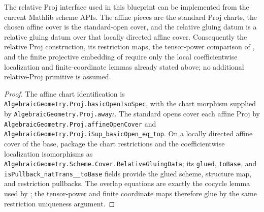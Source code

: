 \begin{lemma}
  \label{lemma:nagata-relative-proj-current-api}

  The relative Proj interface used in this blueprint can be implemented from
  the current Mathlib scheme APIs.  The affine pieces are the standard Proj
  charts, the chosen affine cover is the standard-open cover, and the relative
  gluing datum is a relative gluing datum over that locally directed affine
  cover.  Consequently the relative Proj construction, its restriction maps,
  the tensor-power comparison of
  , and the finite
  projective embedding of
   require only the local
  coefficientwise localization and finite-coordinate lemmas already stated
  above; no additional relative-Proj primitive is assumed.
\end{lemma}

\begin{proof}
  The affine chart identification is
  \texttt{AlgebraicGeometry.Proj.basicOpenIsoSpec}, with the chart morphism
  supplied by \texttt{AlgebraicGeometry.Proj.away\ensuremath{\iota}}.  The
  standard opens cover each affine Proj by
  \texttt{AlgebraicGeometry.Proj.affineOpenCover} and
  \texttt{AlgebraicGeometry.Proj.iSup\_basicOpen\_eq\_top}.  On a locally
  directed affine cover of the base, package the chart restrictions and the
  coefficientwise localization isomorphisms as
  \texttt{AlgebraicGeometry.Scheme.Cover.RelativeGluingData}; its
  \texttt{glued}, \texttt{toBase}, and
  \texttt{isPullback\_natTrans\_\iota\_toBase} fields provide the glued scheme,
  structure map, and restriction pullbacks.  The overlap equations are exactly
  the cocycle lemma used by
  ; the tensor-power and finite
  coordinate maps therefore glue by the same restriction uniqueness argument.
\end{proof}


